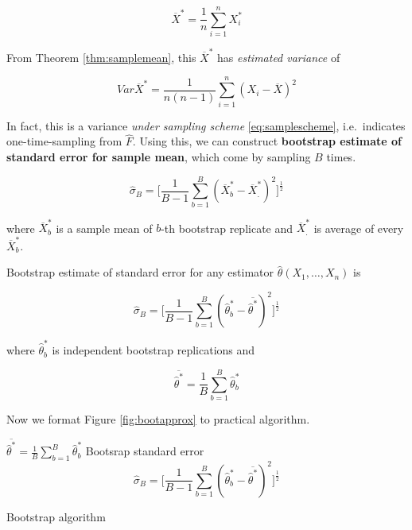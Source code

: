 \documentclass[]{book}
\theoremstyle{definition}
\theoremstyle{definition}
\theoremstyle{definition}
\theoremstyle{remark}
\let\BeginKnitrBlock\begin \let\EndKnitrBlock\end
\begin{document}
\[\overline{X}^{\ast} = \frac{1}{n} \sum_{i = 1}^n X_i^{\ast}\]

From Theorem \ref{thm:samplemean}, this \(\overline{X}^{\ast}\) has \emph{estimated variance} of

\begin{equation}
  Var\overline{X}^{\ast} = \frac{1}{n(n - 1)} \sum_{i = 1}^n (X_i - \overline{X})^2
  \label{eq:varundersam}
\end{equation}

In fact, this is a variance \emph{under sampling scheme} \eqref{eq:samplescheme}, i.e.~indicates one-time-sampling from \(\hat{F}\). Using this, we can construct \textbf{bootstrap estimate of standard error for sample mean}, which come by sampling \(B\) times.

\begin{equation}
  \hat\sigma_B = \bigg[ \frac{1}{B - 1} \sum_{b = 1}^B (\overline{X}_b^{\ast} - \overline{X}_{.}^{\ast})^2 \bigg]^{\frac{1}{2}}
  \label{eq:sebootave}
\end{equation}

where \(\overline{X}_b^{\ast}\) is a sample mean of \(b\)-th bootstrap replicate and \(\overline{X}_{.}^{\ast}\) is average of every \(\overline{X}_b^{\ast}\).

\BeginKnitrBlock{theorem}[Bootstrap standard error]
\protect\hypertarget{thm:bootse}{}{\label{thm:bootse} {} }Bootstrap estimate of standard error for any estimator \(\hat\theta(X_1, \ldots, X_n)\) is

\[\hat\sigma_B = \bigg[ \frac{1}{B - 1} \sum_{b = 1}^B (\hat\theta_b^{\ast} - \overline{\hat\theta^{\ast}})^2 \bigg]^{\frac{1}{2}}\]

where \(\hat\theta_b^{\ast}\) is independent bootstrap replications and

\[\overline{\hat\theta^{\ast}} = \frac{1}{B} \sum_{b = 1}^B \hat\theta_b^{\ast}\]
\EndKnitrBlock{theorem}

Now we format Figure \ref{fig:bootapprox} to practical algorithm.

\begin{algorithm}[H] \label{alg:algboot}
  \SetAlgoLined
  $\overline{\hat\theta^{\ast}} = \frac{1}{B} \sum\limits_{b = 1}^B \hat\theta_b^{\ast}$\;
  Bootsrap standard error $$\hat\sigma_B = \bigg[ \frac{1}{B - 1} \sum_{b = 1}^B (\hat\theta_b^{\ast} - \overline{\hat\theta^{\ast}})^2 \bigg]^{\frac{1}{2}}$$\;
  \caption{Bootstrap algorithm}
\end{algorithm}
\end{document}
